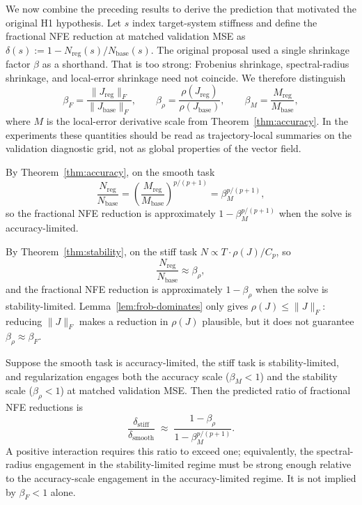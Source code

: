 We now combine the preceding results to derive the prediction that motivated the
original H1 hypothesis. Let $s$ index target-system stiffness and define the
fractional NFE reduction at matched validation MSE as
$\delta(s) := 1 - N_\text{reg}(s)/N_\text{base}(s)$. The original proposal used a
single shrinkage factor $\beta$ as a shorthand. That is too strong: Frobenius
shrinkage, spectral-radius shrinkage, and local-error shrinkage need not
coincide. We therefore distinguish
\begin{equation}
\beta_F =
\frac{\|J_{\mathrm{reg}}\|_F}{\|J_{\mathrm{base}}\|_F},
\qquad
\beta_\rho =
\frac{\rho(J_{\mathrm{reg}})}{\rho(J_{\mathrm{base}})},
\qquad
\beta_M =
\frac{M_{\mathrm{reg}}}{M_{\mathrm{base}}},
\label{eq:beta-definitions}
\end{equation}
where $M$ is the local-error derivative scale from
Theorem~\ref{thm:accuracy}. In the experiments these quantities should be read
as trajectory-local summaries on the validation diagnostic grid, not as global
properties of the vector field.

By Theorem~\ref{thm:accuracy}, on the smooth task
\begin{equation*}
\frac{N_\text{reg}}{N_\text{base}}
  = \left(\frac{M_\text{reg}}{M_\text{base}}\right)^{p/(p+1)}
  = \beta_M^{p/(p+1)},
\end{equation*}
so the fractional NFE reduction is approximately
$1 - \beta_M^{p/(p+1)}$ when the solve is accuracy-limited.

By Theorem~\ref{thm:stability}, on the stiff task
$N \propto T \cdot \rho(J) / C_p$, so
\begin{equation*}
\frac{N_\text{reg}}{N_\text{base}} \approx \beta_\rho,
\end{equation*}
and the fractional NFE reduction is approximately $1-\beta_\rho$ when the
solve is stability-limited. Lemma~\ref{lem:frob-dominates} only gives
$\rho(J) \leq \|J\|_F$: reducing $\|J\|_F$ makes a reduction in $\rho(J)$
plausible, but it does not guarantee $\beta_\rho \approx \beta_F$.

\begin{proposition}
\label{prop:interaction}
Suppose the smooth task is accuracy-limited, the stiff task is
stability-limited, and regularization engages both the accuracy scale
($\beta_M<1$) and the stability scale ($\beta_\rho<1$) at matched validation
MSE. Then the predicted ratio of fractional NFE reductions is
\begin{equation}
\frac{\delta_\text{stiff}}{\delta_\text{smooth}}
  \;\approx\; \frac{1 - \beta_\rho}{1 - \beta_M^{p/(p+1)}}.
\label{eq:interaction-prediction}
\end{equation}
A positive interaction requires this ratio to exceed one; equivalently, the
spectral-radius engagement in the stability-limited regime must be strong
enough relative to the accuracy-scale engagement in the accuracy-limited
regime. It is not implied by $\beta_F<1$ alone.
\end{proposition}

